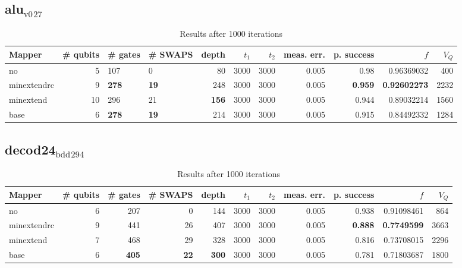 \documentclass[11pt]{article}
\begin{document}
\subsection{alu\(_{\text{v0}}\)\(_{\text{27}}\)}
\label{sec:org1c6837b}
\begin{table}[H]
\caption{\label{tab:org5aae817}
Results after 1000 iterations}
\centering
\small
\begin{tabular}{lrllrrrrrrr}
\hline
Mapper & \# qubits & \# gates & \# SWAPS & depth & \(t_1\) & \(t_2\) & meas. err. & p. success & \(f\) & \(V_Q\)\\
\hline
no & 5 & 107 & 0 & 80 & 3000 & 3000 & 0.005 & 0.98 & 0.96369032 & 400\\
\hline
minextendrc & 9 & \textbf{278} & \textbf{19} & 248 & 3000 & 3000 & 0.005 & \textbf{0.959} & \textbf{0.92602273} & 2232\\
minextend & 10 & 296 & 21 & \textbf{156} & 3000 & 3000 & 0.005 & 0.944 & 0.89032214 & 1560\\
base & 6 & \textbf{278} & \textbf{19} & 214 & 3000 & 3000 & 0.005 & 0.915 & 0.84492332 & 1284\\
\hline
\end{tabular}
\end{table}
\subsection{decod24\(_{\text{bdd}}\)\(_{\text{294}}\)}
\label{sec:org7b7d25e}
\begin{table}[H]
\caption{\label{tab:org75d0309}
Results after 1000 iterations}
\centering
\small
\begin{tabular}{lrrrrrrrrrr}
\hline
Mapper & \# qubits & \# gates & \# SWAPS & depth & \(t_1\) & \(t_2\) & meas. err. & p. success & \(f\) & \(V_Q\)\\
\hline
no & 6 & 207 & 0 & 144 & 3000 & 3000 & 0.005 & 0.938 & 0.91098461 & 864\\
\hline
minextendrc & 9 & 441 & 26 & 407 & 3000 & 3000 & 0.005 & \textbf{0.888} & \textbf{0.7749599} & 3663\\
minextend & 7 & 468 & 29 & 328 & 3000 & 3000 & 0.005 & 0.816 & 0.73708015 & 2296\\
base & 6 & \textbf{405} & \textbf{22} & \textbf{300} & 3000 & 3000 & 0.005 & 0.781 & 0.71803687 & 1800\\
\hline
\end{tabular}
\end{table}
\end{document}
